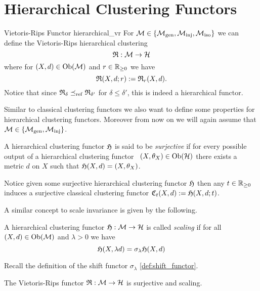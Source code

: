 \chapter{Hierarchical Clustering Functors}
\label{chapter__hierarchical}

\begin{definition}{Vietoris-Rips Functor \cite[Ex.~7.1]{Carlsson2010}}{hierarchical_vr}
For $\mathcal{M} \in \{{\mathcal{M}_\mathrm{gen}},{\mathcal{M}_\mathrm{inj}},{\mathcal{M}_\mathrm{iso}}\}$ we can define the Vietoris-Rips hierarchical clustering
$$
\mathfrak{R}: \mathcal{M} \to \mathcal{H}
$$
where for $(X,d) \in \mathrm {Ob}(\mathcal{M})$ and $r \in \mathbb R_{\geq0}$ we have
$$
\mathfrak{R}(X,d; r) := \mathfrak{R}_r(X,d).
$$
Notice that since $\mathfrak{R}_\delta \preceq_\mathrm{ref} \mathfrak{R}_{\delta'}$ for $\delta \leq \delta'$, this is indeed a hierarchical functor.
\end{definition}

Similar to classical clustering functors we also want to define some properties for hierarchical clustering functors. Moreover from now on we will again assume that $\mathcal{M} \in \{{\mathcal{M}_\mathrm{gen}}, {\mathcal{M}_\mathrm{inj}}\}$.

\begin{definition}{}{}
    A hierarchical clustering functor $\mathfrak{H}$ is said to be \emph{surjective} if for every possible output of a hierarchical clustering functor \ie\ $(X, \theta_X) \in \mathrm {Ob}(\mathcal{H})$ there exists a metric $d$ on $X$ such that $\mathfrak{H}(X,d) = (X, \theta_X)$.
\end{definition}

Notice given some surjective hierarchical clustering functor $\mathfrak{H}$ then any $t \in \mathbb R_{\geq0}$ induces a surjective classical clustering functor $\mathfrak{C}_t(X,d) := \mathfrak{H}(X, d; t)$.

 
A similar concept to scale invariance is given by the following.

\begin{definition}{}{}
A hierarchical clustering functor $\mathfrak{H}: \mathcal{M} \to \mathcal{H}$ is called \emph{scaling} if for all $(X,d) \in \mathrm {Ob}(\mathcal{M})$ and $\lambda > 0$ we have
$$
\mathfrak{H}(X, \lambda d) = \sigma_\lambda \mathfrak{H}(X,d)
$$
\end{definition}
Recall the definition of the shift functor $\sigma_\lambda$ \ref{def:shift_functor}.

\begin{proposition}{}{}
The Vietoris-Rips functor $\mathfrak{R}: \mathcal{M} \to \mathcal{H}$ is surjective and scaling.
\end{proposition}


